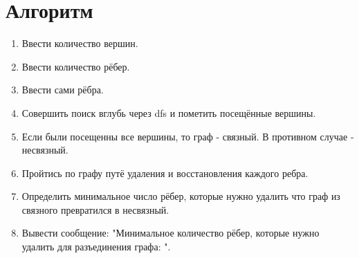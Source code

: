 \documentclass[12pt]{article}
\begin{document}
\section*{Алгоритм}
\begin{enumerate}
    \item Ввести количество вершин.
    \item Ввести количество рёбер.
    \item Ввести сами рёбра.
    \item Совершить поиск вглубь через dfs и пометить посещённые вершины.
    \item Если были посещенны все вершины, то граф - связный. В противном случае - несвязный.
    \item Пройтись по графу путё удаления и восстановления каждого ребра.
    \item Определить минимальное число рёбер, которые нужно удалить что граф из связного превратился в несвязный.
    \item Вывести сообщение: "Минимальное количество рёбер, которые нужно удалить для разъединения графа: ".
\end{enumerate}
\end{document}
